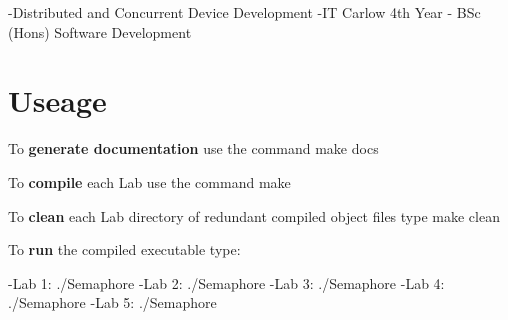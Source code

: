 -\/\+Distributed and Concurrent Device Development -\/\+IT Carlow 4th Year -\/ B\+Sc (Hons) Software Development

\section*{Useage}

To {\bfseries generate documentation} use the command make {\ttfamily docs}

To {\bfseries compile} each Lab use the command {\ttfamily make}

To {\bfseries clean} each Lab directory of redundant compiled object files type {\ttfamily make clean}

To {\bfseries run} the compiled executable type\+:

-\/\+Lab 1\+: {\ttfamily ./\+Semaphore} -\/\+Lab 2\+: {\ttfamily ./\+Semaphore} -\/\+Lab 3\+: {\ttfamily ./\+Semaphore} -\/\+Lab 4\+: {\ttfamily ./\+Semaphore} -\/\+Lab 5\+: {\ttfamily ./\+Semaphore} 